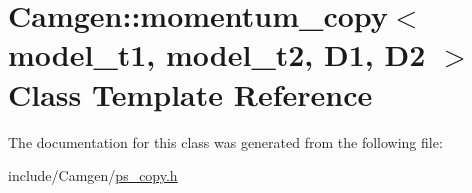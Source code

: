 \hypertarget{a00377}{}\section{Camgen\+:\+:momentum\+\_\+copy$<$ model\+\_\+t1, model\+\_\+t2, D1, D2 $>$ Class Template Reference}
\label{a00377}


The documentation for this class was generated from the following file\+:\begin{DoxyCompactItemize}
\item 
include/\+Camgen/\hyperlink{a00740}{ps\+\_\+copy.\+h}\end{DoxyCompactItemize}
